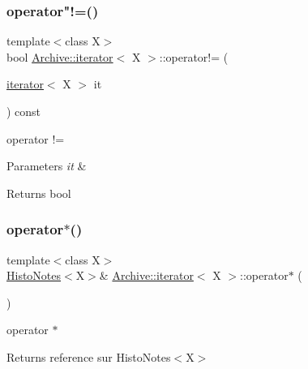 \subsubsection{\texorpdfstring{operator"!=()}{operator!=()}}
{\footnotesize\ttfamily template$<$class X$>$ \\
bool \hyperlink{class_archive_1_1iterator}{Archive\+::iterator}$<$ X $>$\+::operator!= (\begin{DoxyParamCaption}\item[{\hyperlink{class_archive_1_1iterator}{iterator}$<$ X $>$}]{it }\end{DoxyParamCaption}) const\hspace{0.3cm}{\ttfamily [inline]}}



operator != 


\begin{DoxyParams}{Parameters}
{\em it} & \\
\hline
\end{DoxyParams}
\begin{DoxyReturn}{Returns}
bool 
\end{DoxyReturn}
\mbox{\label{class_archive_1_1iterator_add34908444ce9fda99f284e4298ffe30}} 
\subsubsection{\texorpdfstring{operator$\ast$()}{operator*()}}
{\footnotesize\ttfamily template$<$class X$>$ \\
\hyperlink{class_histo_notes}{Histo\+Notes}$<$X$>$\& \hyperlink{class_archive_1_1iterator}{Archive\+::iterator}$<$ X $>$\+::operator$\ast$ (\begin{DoxyParamCaption}{ }\end{DoxyParamCaption})\hspace{0.3cm}{\ttfamily [inline]}}



operator $\ast$ 

\begin{DoxyReturn}{Returns}
reference sur Histo\+Notes$<$\+X$>$ 
\end{DoxyReturn}
\mbox{\label{class_archive_1_1iterator_a9e6e477342ab55de2f596d6534955481}} 
